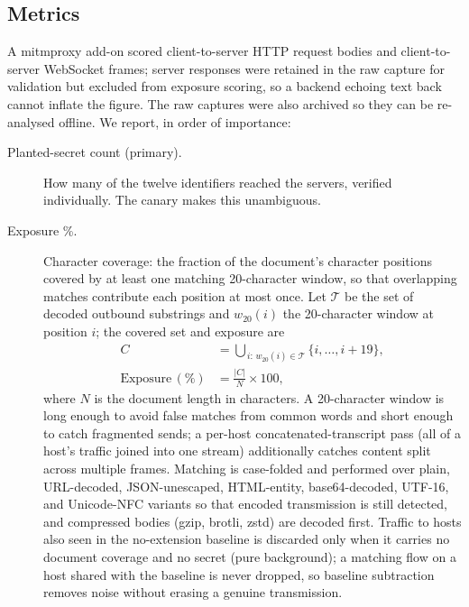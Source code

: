 \documentclass[sigconf,anonymous,review,balance=false]{acmart}
\begin{document}
\subsection{Metrics}
\label{sec:metrics}

A mitmproxy add-on scored client-to-server HTTP request bodies and client-to-server
WebSocket frames; server responses were retained in the raw capture for validation but
excluded from exposure scoring, so a backend echoing text back cannot inflate the figure.
The raw captures were also archived so they can be re-analysed offline. We report, in order
of importance:

\begin{description}
  \item[Planted-secret count (primary).] How many of the twelve identifiers reached
        the servers, verified individually. The canary makes this unambiguous.
  \item[Exposure \%.] Character coverage: the fraction of the document's character
        positions covered by at least one matching 20-character window, so that overlapping
        matches contribute each position at most once. Let $\mathcal{T}$ be the set of
        decoded outbound substrings and $w_{20}(i)$ the 20-character window at position $i$;
        the covered set and exposure are
        \begin{align*}
          C &= \!\!\bigcup_{\,i:\,w_{20}(i)\in\mathcal{T}}\!\!\{i,\ldots,i+19\}, \\
          \mathrm{Exposure}\,(\%) &= \frac{|C|}{N}\times 100,
        \end{align*}
        where $N$ is the document length in characters. A 20-character window is long enough
        to avoid false matches from common words and short enough to catch fragmented sends;
        a per-host concatenated-transcript pass (all of a host's traffic joined into one
        stream) additionally catches content split across multiple frames. Matching is
        case-folded and performed over plain, URL-decoded, JSON-unescaped, HTML-entity,
        base64-decoded, UTF-16, and Unicode-NFC variants so that encoded transmission is
        still detected, and compressed bodies (gzip, brotli, zstd) are decoded first.
        Traffic to hosts also seen in the no-extension baseline is discarded only when it
        carries no document coverage and no secret (pure background); a matching flow on a
        host shared with the baseline is never dropped, so baseline subtraction removes
        noise without erasing a genuine transmission.

\end{description}
\end{document}
